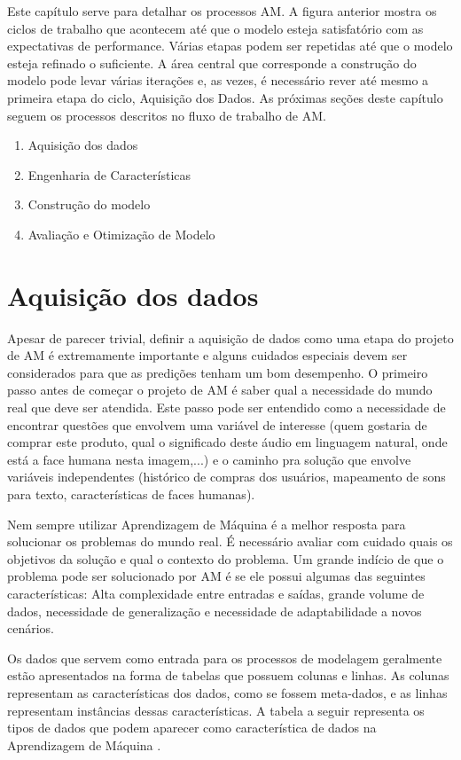 Este capítulo serve para detalhar os processos AM. A figura anterior mostra os ciclos de trabalho que acontecem até que o modelo esteja satisfatório com as expectativas de performance. Várias etapas podem ser repetidas até que o modelo esteja refinado o suficiente. A área central que corresponde a construção do modelo pode levar várias iterações e, as vezes, é necessário rever até mesmo a primeira etapa do ciclo, Aquisição dos Dados. As próximas seções deste capítulo seguem os processos descritos no fluxo de trabalho de AM.

\begin{enumerate}
\item Aquisição dos dados
\item Engenharia de Características
\item Construção do modelo
\item Avaliação e Otimização de Modelo
\end{enumerate}

\section{Aquisição dos dados}
Apesar de parecer trivial, definir a aquisição de dados como uma etapa do projeto de AM é extremamente importante e alguns cuidados especiais devem ser considerados para que as predições tenham um bom desempenho. O primeiro passo antes de começar o projeto de AM é saber qual a necessidade do mundo real que deve ser atendida. Este passo pode ser entendido como a necessidade de encontrar questões que envolvem uma variável de interesse (quem gostaria de comprar este produto, qual o significado deste áudio em linguagem natural, onde está a face humana nesta imagem,...) e o caminho pra solução que envolve variáveis independentes (histórico de compras dos usuários, mapeamento de sons para texto, características de faces humanas).

Nem sempre utilizar Aprendizagem de Máquina é a melhor resposta para solucionar os problemas do mundo real. É necessário avaliar com cuidado quais os objetivos da solução e qual o contexto do problema. Um grande indício de que o problema pode ser solucionado por AM é se ele possui algumas das seguintes características: Alta complexidade entre entradas e saídas, grande volume de dados, necessidade de generalização e necessidade de adaptabilidade a novos cenários. 

Os dados que servem como entrada para os processos de modelagem geralmente estão apresentados na forma de tabelas que possuem colunas e linhas. As colunas representam as características dos dados, como se fossem meta-dados, e as linhas representam instâncias dessas características. A tabela a seguir representa os tipos de dados que podem aparecer como característica de dados na Aprendizagem de Máquina \cite{guy2010}.


